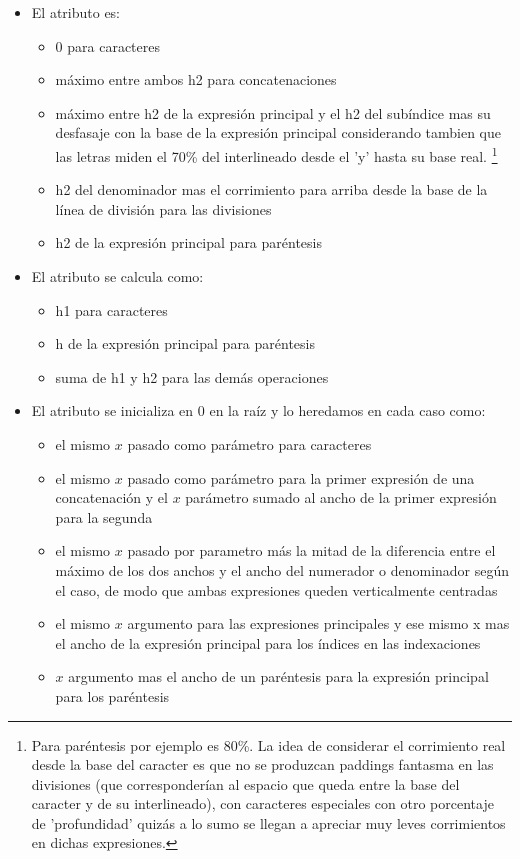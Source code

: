 \begin{itemize}
	\item El atributo \textbf{} es:
	\begin{itemize}
		\item 0 para caracteres
		\item máximo entre ambos h2 para concatenaciones
		\item máximo entre h2 de la expresión principal y el h2 del subíndice mas su desfasaje con la base de la expresión principal considerando tambien que las letras miden el 70\% del interlineado desde el 'y' hasta su base real. \footnote{Para paréntesis por ejemplo es 80\%. La idea de considerar el corrimiento real desde la base del caracter es que no se produzcan paddings fantasma en las divisiones (que corresponderían al espacio que queda entre la base del caracter y de su interlineado), con caracteres especiales con otro porcentaje de 'profundidad' quizás a lo sumo se llegan a apreciar muy leves corrimientos en dichas expresiones.}
		\item h2 del denominador mas el corrimiento para arriba desde la base de la línea de división para las divisiones
		\item h2 de la expresión principal para paréntesis
	\end{itemize}

	\item El atributo \textbf{} se calcula como:
	\begin{itemize}
		\item h1 para caracteres
		\item h de la expresión principal para paréntesis
		\item suma de h1 y h2 para las demás operaciones
	\end{itemize}

	\item El atributo \textbf{} se inicializa en 0 en la raíz y lo heredamos en cada caso como:
	\begin{itemize}
		\item el mismo $x$ pasado como parámetro para caracteres
		\item el mismo $x$ pasado como parámetro para la primer expresión de una concatenación y el $x$ parámetro sumado al ancho de la primer expresión para la segunda
		\item el mismo $x$ pasado por parametro más la mitad de la diferencia entre el máximo de los dos anchos y el ancho del numerador o denominador según el caso, de modo que ambas expresiones queden verticalmente centradas
		\item el mismo $x$ argumento para las expresiones principales y ese mismo x mas el ancho de la expresión principal para los índices en las indexaciones
		\item $x$ argumento mas el ancho de un paréntesis para la expresión principal para los paréntesis
	\end{itemize}


\end{itemize}
